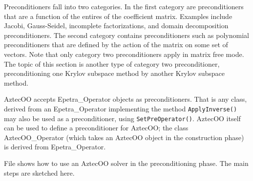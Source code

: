 Preconditioners fall into two categories.
In the first category 
are preconditioners that are a function of the entires of the coefficient matrix.
Examples include Jacobi, Gauss-Seidel, incomplete factorizations, and domain
decomposition preconditioners.
The second category contains preconditioners 
such as polynomial preconditioners
that are defined by the action of
the matrix on some set of vectors.
Note that only category two preconditioners apply in matrix free mode.
The topic of this section is another type of category two preconditioner, 
preconditioning one Krylov subspace method by another Krylov subspace method. 

AztecOO accepts Epetra\_Operator objects as preconditioners. That is
any class, derived from an Epetra\_Operator implementing the
method \verb!ApplyInverse()! may also be used as a preconditioner,
using \verb!SetPreOperator()!. AztecOO itself can be used to define a
preconditioner for AztecOO; the class AztecOO\_Operator (which takes an
AztecOO object in the construction phase) is derived from
Epetra\_Operator.

File  shows how to use an AztecOO solver in the
preconditioning phase.  The main steps are sketched here.

